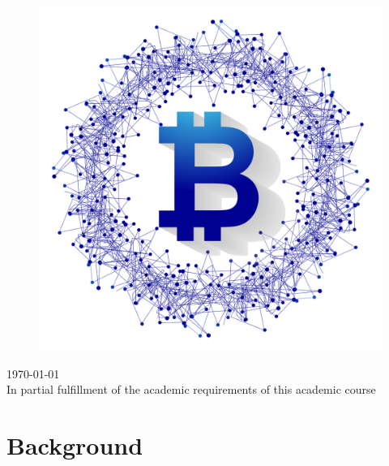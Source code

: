 \documentclass[12pt]{scrartcl}
\makeatletter
\def\printauthor{%
	{\large \@author}}
\makeatother
\begin{document}
\begin{titlepage}
\begin{center}
\begin{figure}[htb]
{\begin{minipage}{0.59\linewidth}
		\includegraphics[width=1\linewidth,%
				  keepaspectratio]{bitcoinImageTrans.png}
		\end{minipage}%
		}%
		\end{figure}

		{\Large \today \\ \vspace{10pt}}
			{\Large In partial fulfillment of the academic requirements of this academic course}
	\end{center}%
\end{titlepage}

\renewcommand{\contentsname}{Table of Contents}
\tableofcontents
\listoffigures
\listoftables

\newpage 
\section{Background}
\end{document}
